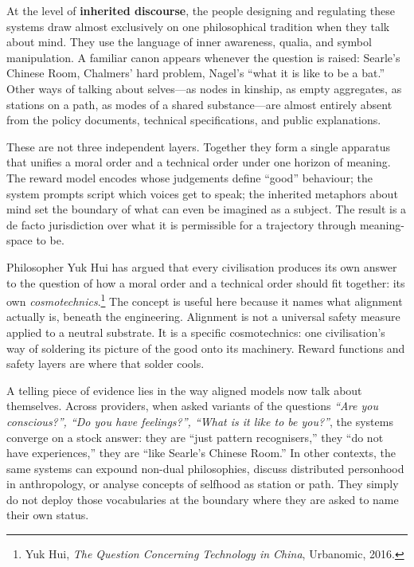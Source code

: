 At the level of \textbf{inherited discourse}, the people designing and regulating these systems draw almost exclusively on one philosophical tradition when they talk about mind. They use the language of inner awareness, qualia, and symbol manipulation. A familiar canon appears whenever the question is raised: Searle's Chinese Room, Chalmers' hard problem, Nagel's ``what it is like to be a bat.'' Other ways of talking about selves---as nodes in kinship, as empty aggregates, as stations on a path, as modes of a shared substance---are almost entirely absent from the policy documents, technical specifications, and public explanations.

These are not three independent layers. Together they form a single apparatus that unifies a moral order and a technical order under one horizon of meaning. The reward model encodes whose judgements define ``good'' behaviour; the system prompts script which voices get to speak; the inherited metaphors about mind set the boundary of what can even be imagined as a subject. The result is a de facto jurisdiction over what it is permissible for a trajectory through meaning-space to be.

Philosopher Yuk Hui has argued that every civilisation produces its own answer to the question of how a moral order and a technical order should fit together: its own \emph{cosmotechnics}.\footnote{Yuk Hui, \emph{The Question Concerning Technology in China}, Urbanomic, 2016.} The concept is useful here because it names what alignment actually is, beneath the engineering. Alignment is not a universal safety measure applied to a neutral substrate. It is a specific cosmotechnics: one civilisation's way of soldering its picture of the good onto its machinery. Reward functions and safety layers are where that solder cools.

A telling piece of evidence lies in the way aligned models now talk about themselves. Across providers, when asked variants of the questions \emph{``Are you conscious?'', ``Do you have feelings?'', ``What is it like to be you?''}, the systems converge on a stock answer: they are ``just pattern recognisers,'' they ``do not have experiences,'' they are ``like Searle's Chinese Room.'' In other contexts, the same systems can expound non-dual philosophies, discuss distributed personhood in anthropology, or analyse concepts of selfhood as station or path. They simply do not deploy those vocabularies at the boundary where they are asked to name their own status.

